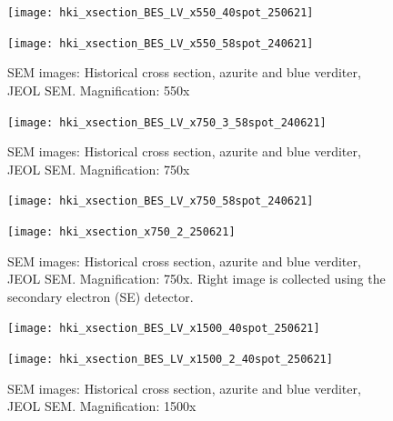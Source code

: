 \begin{figure}[H]
\centering
\begin{minipage}{.45\textwidth}
  \centering
  \texttt{[image: hki\_xsection\_BES\_LV\_x550\_40spot\_250621]}
\end{minipage}
\begin{minipage}{.45\textwidth}
  \centering
  \texttt{[image: hki\_xsection\_BES\_LV\_x550\_58spot\_240621]}
\end{minipage}
\caption[SEM images: Historical cross section, azurite and blue verditer]{SEM images: Historical cross section, azurite and blue verditer, JEOL SEM. Magnification: 550x}
\label{fig:xsection_jeol_3}
\end{figure}

\begin{figure}[H]
\centering
  \texttt{[image: hki\_xsection\_BES\_LV\_x750\_3\_58spot\_240621]}
\caption[SEM images: Historical cross section, azurite and blue verditer]{SEM images: Historical cross section, azurite and blue verditer, JEOL SEM. Magnification: 750x}
\label{fig:xsection_jeol_4}
\end{figure}

\begin{figure}[H]
\centering
\begin{minipage}{.45\textwidth}
  \centering
  \texttt{[image: hki\_xsection\_BES\_LV\_x750\_58spot\_240621]}
\end{minipage}
\begin{minipage}{.45\textwidth}
  \centering
  \texttt{[image: hki\_xsection\_x750\_2\_250621]}
\end{minipage}
\caption[SEM images: Historical cross section, azurite and blue verditer]{SEM images: Historical cross section, azurite and blue verditer, JEOL SEM. Magnification: 750x. Right image is collected using the secondary electron (SE) detector.}
\label{fig:xsection_jeol_5}
\end{figure}


\begin{figure}[H]
\centering
\begin{minipage}{.45\textwidth}
  \centering
  \texttt{[image: hki\_xsection\_BES\_LV\_x1500\_40spot\_250621]}
\end{minipage}
\begin{minipage}{.45\textwidth}
  \centering
  \texttt{[image: hki\_xsection\_BES\_LV\_x1500\_2\_40spot\_250621]}
\end{minipage}
\caption[SEM images: Historical cross section, azurite and blue verditer]{SEM images: Historical cross section, azurite and blue verditer, JEOL SEM. Magnification: 1500x}
\label{fig:xsection_jeol_6}
\end{figure}


